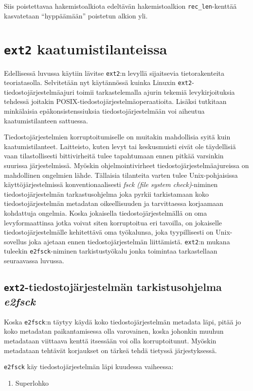 Siis poistettavaa hakemistoalkiota edeltävän hakemistoalkion \texttt{rec\_len}-kenttää kasvatetaan ``hyppäämään'' poistetun alkion yli.

\section{\texttt{ext2} kaatumistilanteissa}
\label{ChapExt2Crash}

Edellisessä luvussa käytiin lävitse \texttt{ext2}:n levyllä sijaitsevia tietorakenteita teoriatasolla.
Selvitetään nyt käytännössä kuinka Linuxin \texttt{ext2}-tiedostojärjestelmäajuri toimii tarkastelemalla ajurin tekemiä levykirjoituksia tehdessä joitakin POSIX-tiedostojärjestelmäoperaatioita.
Lisäksi tutkitaan minkälaisia epäkonsistenssiuksia tiedostojärjestelmään voi aiheutua kaatumistilanteen sattuessa.

Tiedostojärjestelmien korruptoitumiselle on muitakin mahdollisia syitä kuin kaatumistilanteet.
Laitteisto, kuten levyt tai keskusmuisti eivät ole täydellisiä vaan tilastollisesti bittivirheitä tulee tapahtumaan ennen pitkää varsinkin suurissa järjestelmissä.
Myöskin ohjelmointivirheet tiedostojärjestelmäajureissa on mahdollinen ongelmien lähde.
Tällaisia tilanteita varten tulee Unix-pohjaisissa käyttöjärjestelmissä konventionaalisesti \emph{fsck (file system check)}-niminen tiedostojärjestelmän tarkastusohjelma joka pyrkii tarkistamaan koko tiedostojärjestelmän metadatan oikeellisuuden ja tarvittaessa korjaamaan kohdattuja ongelmia.
Koska jokaisella tiedostojärjestelmällä on oma levyformaattinsa jotka voivat siten korruptoitua eri tavoilla,
on jokaiselle tiedostojärjestelmälle kehitettävä oma työkalunsa,
joka tyypillisesti on Unix-sovellus joka ajetaan ennen tiedostojärjestelmän liittämistä.
\texttt{ext2}:n mukana tuleekin \texttt{e2fsck}-niminen tarkistustyökalu jonka toimintaa tarkastellaan seuraavassa luvussa.

\subsection{\texttt{ext2}-tiedostojärjestelmän tarkistusohjelma \emph{e2fsck}}

Koska \texttt{e2fsck}:n täytyy käydä koko tiedostojärjestelmän metadata läpi,
pitää jo koko metadatan paikantamisessa olla varovainen,
koska johonkin muuhun metadataan viittaava kenttä itsessään voi olla korruptoitunut.
Myöskin metadataan tehtävät korjaukset on tärkeä tehdä tietyssä järjestyksessä.

\texttt{e2fsck} käy tiedostojärjestelmän läpi kuudessa vaiheessa:
\begin{enumerate}
    \item{Superlohko}
\end{enumerate}

